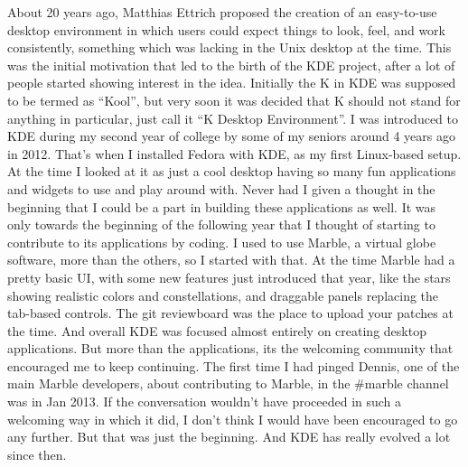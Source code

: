

\noindent{}About 20 years ago, Matthias Ettrich proposed the creation of an easy-to-use desktop environment in which users could expect things to look, feel, and work consistently, something which was lacking in the Unix desktop at the time. This was the initial motivation that led to the birth of the KDE project, after a lot of people started showing interest in the idea. Initially the K in KDE was supposed to be termed as “Kool”, but very soon it was decided that K should not stand for anything in particular, just call it “K Desktop Environment”. I was introduced to KDE during my second year of college by some of my seniors around 4 years ago in 2012. That's when I installed Fedora with KDE, as my first Linux-based setup. At the time I looked at it as just a cool desktop having so many fun applications and widgets to use and play around with. Never had I given a thought in the beginning that I could be a part in building these applications as well. It was only towards the beginning of the following year that I thought of starting to contribute to its applications by coding. I used to use Marble, a virtual globe software, more than the others, so I started with that. At the time Marble had a pretty basic UI, with some new features just introduced that year, like the stars showing realistic colors and constellations, and draggable panels replacing the tab-based controls. The git reviewboard was the place to upload your patches at the time. And overall KDE was focused almost entirely on creating desktop applications. But more than the applications, its the welcoming community that encouraged me to keep continuing. The first time I had pinged Dennis, one of the main Marble developers, about contributing to Marble, in the \#marble channel was in Jan 2013. If the conversation wouldn't have proceeded in such a welcoming way in which it did, I don't think I would have been encouraged to go any further. But that was just the beginning. And KDE has really evolved a lot since then.

